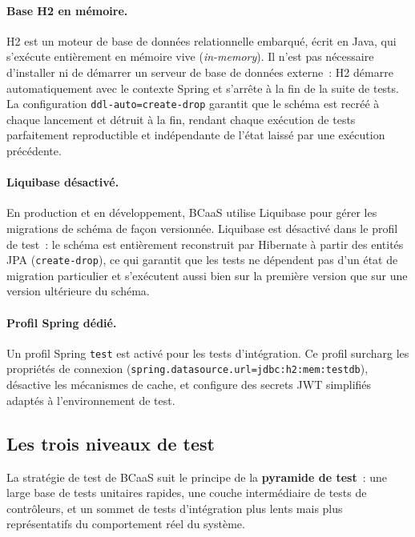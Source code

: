 \paragraph{Base H2 en mémoire.}
H2 est un moteur de base de données relationnelle embarqué, écrit en Java, qui s'exécute
entièrement en mémoire vive (\textit{in-memory}). Il n'est pas nécessaire d'installer ni
de démarrer un serveur de base de données externe~: H2 démarre automatiquement avec le
contexte Spring et s'arrête à la fin de la suite de tests. La configuration
\texttt{ddl-auto=create-drop} garantit que le schéma est recréé à chaque lancement et
détruit à la fin, rendant chaque exécution de tests parfaitement reproductible et
indépendante de l'état laissé par une exécution précédente.

\paragraph{Liquibase désactivé.}
En production et en développement, BCaaS utilise Liquibase pour gérer les migrations de
schéma de façon versionnée. Liquibase est désactivé dans le profil de test~: le schéma est
entièrement reconstruit par Hibernate à partir des entités JPA (\texttt{create-drop}), ce
qui garantit que les tests ne dépendent pas d'un état de migration particulier et
s'exécutent aussi bien sur la première version que sur une version ultérieure du schéma.

\paragraph{Profil Spring dédié.}
Un profil Spring \texttt{test} est activé pour les tests d'intégration. Ce profil
surcharg les propriétés de connexion (\texttt{spring.datasource.url=jdbc:h2:mem:testdb}),
désactive les mécanismes de cache, et configure des secrets JWT simplifiés adaptés à
l'environnement de test.

\subsection{Les trois niveaux de test}
\label{subsec:niveaux-test}

La stratégie de test de BCaaS suit le principe de la \textbf{pyramide de test}~: une large
base de tests unitaires rapides, une couche intermédiaire de tests de contrôleurs, et un
sommet de tests d'intégration plus lents mais plus représentatifs du comportement réel du
système.

